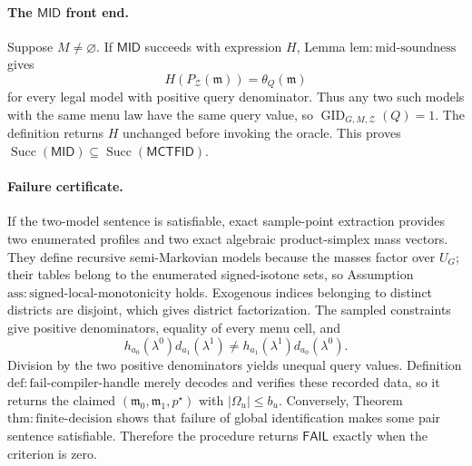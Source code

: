 \paragraph{The \(\mathsf{MID}\) front end.}
Suppose \(M\ne\varnothing\).  If \(\mathsf{MID}\) succeeds with expression \(H\), Lemma \(\mathrm{lem:mid\text{-}soundness}\) gives
\[
 H(P_{\mathcal Z}(\mathfrak m))=\theta_Q(\mathfrak m)
\]
for every legal model with positive query denominator.  Thus any two such models with the same menu law have the same query value, so \(\operatorname{GID}_{G,M,\mathcal Z}(Q)=1\).  The definition returns \(H\) unchanged before invoking the oracle.  This proves
\(\operatorname{Succ}(\mathsf{MID})\subseteq\operatorname{Succ}(\mathsf{MCTFID})\).

\paragraph{Failure certificate.}
If the two-model sentence is satisfiable, exact sample-point extraction provides two enumerated profiles and two exact algebraic product-simplex mass vectors.  They define recursive semi-Markovian models because the masses factor over \(U_G\); their tables belong to the enumerated signed-isotone sets, so Assumption \(\mathrm{ass:signed\text{-}local\text{-}monotonicity}\) holds.  Exogenous indices belonging to distinct districts are disjoint, which gives district factorization.  The sampled constraints give positive denominators, equality of every menu cell, and
\[
 h_{a_0}(\lambda^0)d_{a_1}(\lambda^1)
 \ne h_{a_1}(\lambda^1)d_{a_0}(\lambda^0).
\]
Division by the two positive denominators yields unequal query values.  Definition \(\mathrm{def:fail\text{-}compiler\text{-}handle}\) merely decodes and verifies these recorded data, so it returns the claimed \((\mathfrak m_0,\mathfrak m_1,p^\star)\) with \(|\Omega_u|\le b_u\).  Conversely, Theorem \(\mathrm{thm:finite\text{-}decision}\) shows that failure of global identification makes some pair sentence satisfiable.  Therefore the procedure returns \(\mathsf{FAIL}\) exactly when the criterion is zero.

